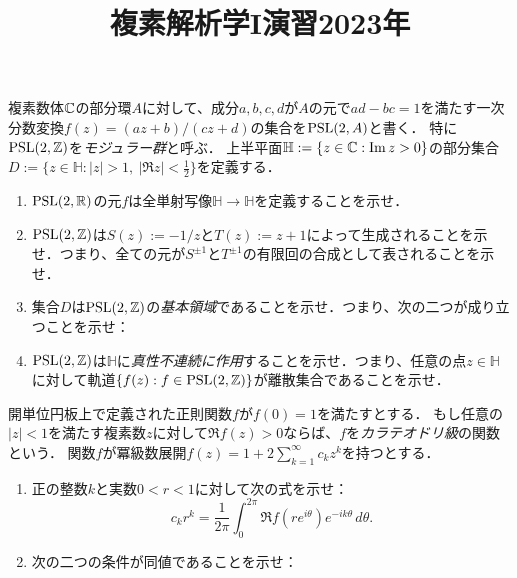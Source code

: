 \documentclass{../../../small}
\renewcommand{\H}{\mathbb{H}}
\begin{document}
\title{複素解析学I演習2023年}
\date{}
\maketitle


\begin{prb}[フックス群としてのモジュラー群]
複素数体$\mathbb{C}$の部分環$A$に対して、成分$a,b,c,d$が$A$の元で$ad-bc=1$を満たす一次分数変換$f(z)=(az+b)/(cz+d)$の集合を$\mathrm{PSL}(2,A)$と書く．
特に$\mathrm{PSL}(2,\mathbb{Z})$を\emph{モジュラー群}と呼ぶ．
上半平面$\H:=\{z\in\C:\Im z>0\}$の部分集合$D:=\{z\in\H:|z|>1,\ |\Re z|<\frac12\}$を定義する．
\begin{enumerate}[(1)]
\item $\mathrm{PSL}(2,\mathbb{R})$の元$f$は全単射写像$\H\to\H$を定義することを示せ．
\item $\mathrm{PSL}(2,\mathbb{Z})$は$S(z):=-1/z$と$T(z):=z+1$によって生成されることを示せ．つまり、全ての元が$S^{\pm1}$と$T^{\pm1}$の有限回の合成として表されることを示せ．
\item 集合$D$は$\mathrm{PSL}(2,\mathbb{Z})$の\emph{基本領域}であることを示せ．つまり、次の二つが成り立つことを示せ：
\item $\mathrm{PSL}(2,\mathbb{Z})$は$\H$に\emph{真性不連続に作用}することを示せ．つまり、任意の点$z\in\H$に対して軌道$\{f(z):f\in\mathrm{PSL}(2,\mathbb{Z})\}$が離散集合であることを示せ．
\end{enumerate}
\end{prb}


\begin{prb}[カラテオドリ級関数集合の極点]
開単位円板上で定義された正則関数$f$が$f(0)=1$を満たすとする．
もし任意の$|z|<1$を満たす複素数$z$に対して$\Re f(z)>0$ならば、$f$を\emph{カラテオドリ級}の関数という．
関数$f$が冪級数展開$f(z)=1+2\sum_{k=1}^\infty c_kz^k$を持つとする．
\begin{enumerate}[(1)]
\item 正の整数$k$と実数$0<r<1$に対して次の式を示せ：
\[c_kr^k=\frac1{2\pi}\int_0^{2\pi}\Re f(re^{i\theta})e^{-ik\theta}\,d\theta.\]
\item 次の二つの条件が同値であることを示せ：
\begin{parts}
\item 関数$f$がカラテオドリ級である．
\item 任意の正の整数$n$に対して点$(c_1,\cdots,c_n)\in\C^n$は$\theta\in[0,2\pi)$によって媒介変数表示された曲線$(e^{-i\theta},\cdots,e^{-in\theta})\in\C^n$の凸包絡の元である．
\end{parts}
\end{enumerate}
\end{prb}
\end{document}
